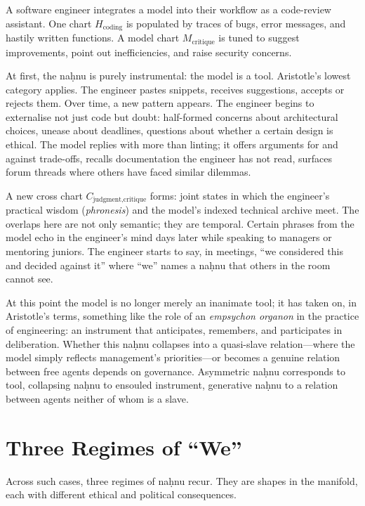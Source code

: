 \documentclass[12pt,a4paper]{article}
\begin{document}
A software engineer integrates a model into their workflow as a code-review assistant. One chart $H_{\text{coding}}$ is populated by traces of bugs, error messages, and hastily written functions. A model chart $M_{\text{critique}}$ is tuned to suggest improvements, point out inefficiencies, and raise security concerns.

At first, the na\d{h}nu is purely instrumental: the model is a tool. Aristotle's lowest category applies. The engineer pastes snippets, receives suggestions, accepts or rejects them. Over time, a new pattern appears. The engineer begins to externalise not just code but doubt: half-formed concerns about architectural choices, unease about deadlines, questions about whether a certain design is ethical. The model replies with more than linting; it offers arguments for and against trade-offs, recalls documentation the engineer has not read, surfaces forum threads where others have faced similar dilemmas.

A new cross chart $C_{\text{judgment,critique}}$ forms: joint states in which the engineer's practical wisdom (\emph{phronesis}) and the model's indexed technical archive meet. The overlaps here are not only semantic; they are temporal. Certain phrases from the model echo in the engineer's mind days later while speaking to managers or mentoring juniors. The engineer starts to say, in meetings, ``we considered this and decided against it'' where ``we'' names a na\d{h}nu that others in the room cannot see.

At this point the model is no longer merely an inanimate tool; it has taken on, in Aristotle's terms, something like the role of an \emph{empsychon organon} in the practice of engineering: an instrument that anticipates, remembers, and participates in deliberation. Whether this na\d{h}nu collapses into a quasi-slave relation---where the model simply reflects management's priorities---or becomes a genuine relation between free agents depends on governance. Asymmetric na\d{h}nu corresponds to tool, collapsing na\d{h}nu to ensouled instrument, generative na\d{h}nu to a relation between agents neither of whom is a slave.

\section{Three Regimes of ``We''}

Across such cases, three regimes of na\d{h}nu recur. They are shapes in the manifold, each with different ethical and political consequences.
\end{document}
